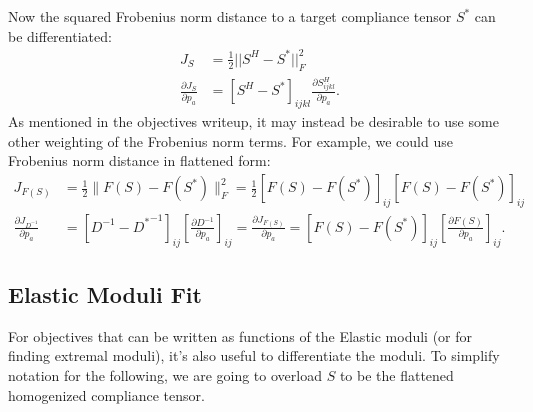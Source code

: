 \documentclass[10pt]{article}
\providecommand{\norm}[1]{\lVert#1\rVert}
\providecommand{\pder}[2]{\frac{\partial #1}{\partial #2}}
\begin{document}
Now the squared Frobenius norm distance to a target compliance tensor $S^*$ can
be differentiated:
\begin{align*}
    J_S &= \frac{1}{2} ||S^H - S^*||^2_F \\
    \pder{J_S}{p_a} &= \left[S^H - S^*\right]_{ijkl} \pder{S^H_{ijkl}}{p_a}.
\end{align*}
As mentioned in the objectives writeup, it may instead be desirable to use some
other weighting of the Frobenius norm terms. For example, we could use Frobenius
norm distance in flattened form:
\begin{align*}
    J_{F(S)} &= \frac{1}{2} \norm{F(S) - F(S^*)}^2_F =
        \frac{1}{2} \left[F(S) - F(S^*)\right]_{ij}
                    \left[F(S) - F(S^*)\right]_{ij} \\
                    \pder{J_{D^{-1}}}{p_a} &= [D^{-1} - {D^*}^{-1}]_{ij}
                    \left[\pder{D^{-1}}{p_a}\right]_{ij} = 
        \pder{J_{F(S)}}{p_a} = \left[F(S) - F(S^*)\right]_{ij}
                    \left[\pder{F(S)}{p_a}\right]_{ij}.
\end{align*}

\subsection{Elastic Moduli Fit}
For objectives that can be written as functions of the Elastic moduli (or for
finding extremal moduli), it's also useful to differentiate the moduli.
To simplify notation for the following, we are going to overload $S$ to be the
flattened homogenized compliance tensor.
\end{document}
